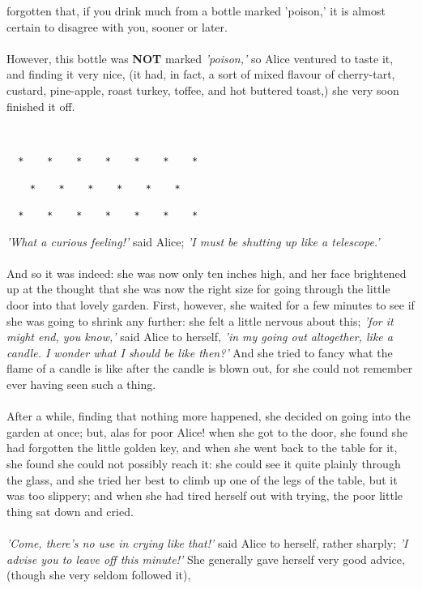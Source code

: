 \documentclass[12pt]{article}
\begin{document}
forgotten that, if you drink much from a bottle marked 'poison,' it is
almost certain to disagree with you, sooner or later.\\\\However, this bottle was \textbf{NOT} marked \emph{'poison,'} so Alice ventured to taste
it, and finding it very nice, (it had, in fact, a sort of mixed flavour
of cherry-tart, custard, pine-apple, roast turkey, toffee, and hot
buttered toast,) she very soon finished it off.\\\\\begin{verbatim}

  *    *    *    *    *    *    *

    *    *    *    *    *    *

  *    *    *    *    *    *    *

\end{verbatim}\textit{'What a curious feeling!'} said Alice; \textit{'I must be shutting up like a
    telescope.'}\\\\And so it was indeed: she was now only ten inches high, and her face
brightened up at the thought that she was now the right size for going
through the little door into that lovely garden. First, however, she
waited for a few minutes to see if she was going to shrink any further:
she felt a little nervous about this; \textit{'for it might end, you know,'} said
Alice to herself, \textit{'in my going out altogether, like a candle. I wonder
what I should be like then?'} And she tried to fancy what the flame of a
candle is like after the candle is blown out, for she could not remember
ever having seen such a thing.\\\\After a while, finding that nothing more happened, she decided on going
into the garden at once; but, alas for poor Alice! when she got to the
door, she found she had forgotten the little golden key, and when she
went back to the table for it, she found she could not possibly reach
it: she could see it quite plainly through the glass, and she tried her
best to climb up one of the legs of the table, but it was too slippery;
and when she had tired herself out with trying, the poor little thing
sat down and cried.\\\\\textit{'Come, there's no use in crying like that!'} said Alice to herself,
rather sharply; \textit{'I advise you to leave off this minute!'} She generally
gave herself very good advice, (though she very seldom followed it),
\end{document}
